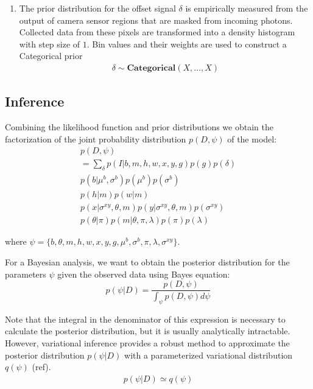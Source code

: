 \begin{enumerate}
\item The prior distribution for the offset signal $\delta$ is empirically measured from the output of camera sensor regions that are masked from incoming photons. Collected data from these pixels are transformed into a density histogram with step size of $1$. Bin values and their weights are used to construct a Categorical prior
%
\begin{gather*}
    \delta \sim \mathbf{Categorical}(X, \dots, X)
\end{gather*}

\end{enumerate}



\subsection*{Inference}

Combining the likelihood function and prior distributions we obtain the factorization of the joint probability distribution $p(D, \psi)$ of the model:
%
\begin{gather*}
    p(D, \psi) \\
    = \sum_\delta p(I | b, m, h, w, x, y, g) p(g) p(\delta) \\
    p(b | \mu^b, \sigma^b) p(\mu^b) p(\sigma^b) \\
    p(h | m) p(w | m) \\
    p(x | \sigma^{xy}, \theta, m) p(y | \sigma^{xy}, \theta, m) p(\sigma^{xy}) \\
    p(\theta | \pi) p(m | \theta, \pi, \lambda) p(\pi) p(\lambda) 
\end{gather*} 

\noindent
where $\psi = \{ b, \theta, m, h, w, x, y, g, \mu^b, \sigma^b, \pi, \lambda, \sigma^{xy} \}$.

For a Bayesian analysis, we want to obtain the posterior distribution for the parameters $\psi$ given the observed data using Bayes equation:
%
\begin{equation}
    p(\psi | D) =
    \dfrac{p(D, \psi)}{\int_\psi p(D, \psi) d\psi}
\end{equation}

Note that the integral in the denominator of this expression is necessary to calculate the posterior distribution, but it is usually analytically intractable. However, variational inference provides a robust method to approximate the posterior distribution $p(\psi | D)$ with a parameterized variational distribution $q(\psi)$ (ref).
%
\begin{gather*}
    p(\psi | D) \simeq q(\psi)
\end{gather*}


